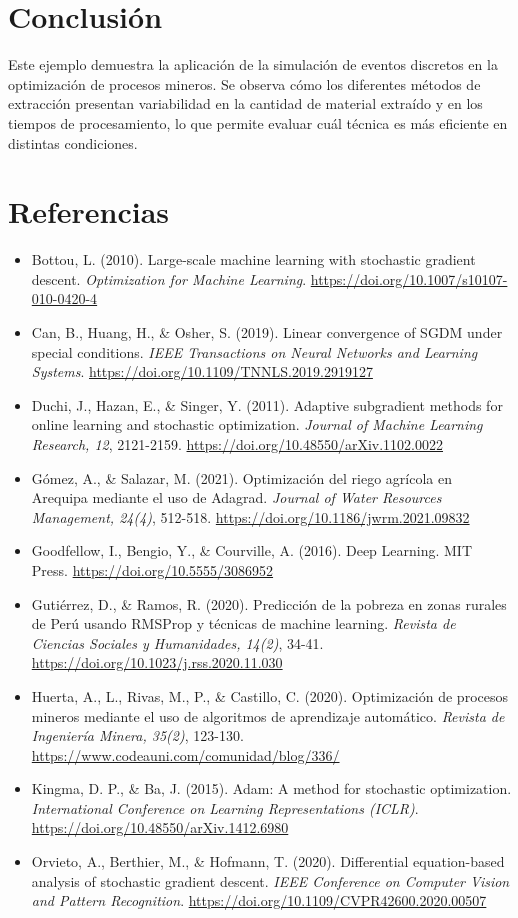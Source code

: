 \documentclass[a5paper]{article}
\begin{document}
	\section*{Conclusión}
	Este ejemplo demuestra la aplicación de la simulación de eventos discretos en la optimización de procesos mineros. Se observa cómo los diferentes métodos de extracción presentan variabilidad en la cantidad de material extraído y en los tiempos de procesamiento, lo que permite evaluar cuál técnica es más eficiente en distintas condiciones.
	\section*{Referencias}
	
	\begin{itemize}
		\item Bottou, L. (2010). Large-scale machine learning with stochastic gradient descent. \textit{Optimization for Machine Learning}. \url{https://doi.org/10.1007/s10107-010-0420-4}
		\item Can, B., Huang, H., \& Osher, S. (2019). Linear convergence of SGDM under special conditions. \textit{IEEE Transactions on Neural Networks and Learning Systems}. \url{https://doi.org/10.1109/TNNLS.2019.2919127}
		\item Duchi, J., Hazan, E., \& Singer, Y. (2011). Adaptive subgradient methods for online learning and stochastic optimization. \textit{Journal of Machine Learning Research, 12}, 2121-2159. \url{https://doi.org/10.48550/arXiv.1102.0022}
		\item Gómez, A., \& Salazar, M. (2021). Optimización del riego agrícola en Arequipa mediante el uso de Adagrad. \textit{Journal of Water Resources Management, 24(4)}, 512-518. \url{https://doi.org/10.1186/jwrm.2021.09832}
		\item Goodfellow, I., Bengio, Y., \& Courville, A. (2016). Deep Learning. MIT Press. \url{https://doi.org/10.5555/3086952}
		\item Gutiérrez, D., \& Ramos, R. (2020). Predicción de la pobreza en zonas rurales de Perú usando RMSProp y técnicas de machine learning. \textit{Revista de Ciencias Sociales y Humanidades, 14(2)}, 34-41. \url{https://doi.org/10.1023/j.rss.2020.11.030}
		\item Huerta, A., L., Rivas, M., P., \& Castillo, C. (2020). Optimización de procesos mineros mediante el uso de algoritmos de aprendizaje automático. \textit{Revista de Ingeniería Minera, 35(2)}, 123-130. \url{https://www.codeauni.com/comunidad/blog/336/}
		\item Kingma, D. P., \& Ba, J. (2015). Adam: A method for stochastic optimization. \textit{International Conference on Learning Representations (ICLR)}. \url{https://doi.org/10.48550/arXiv.1412.6980}
		\item Orvieto, A., Berthier, M., \& Hofmann, T. (2020). Differential equation-based analysis of stochastic gradient descent. \textit{IEEE Conference on Computer Vision and Pattern Recognition}. \url{https://doi.org/10.1109/CVPR42600.2020.00507}
		

\end{itemize}
\end{document}
